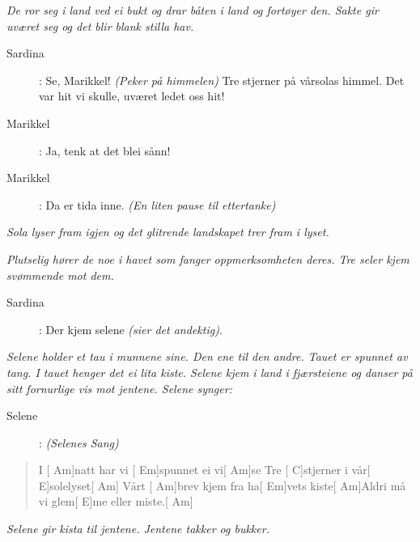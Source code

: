 {\noindent \textit{\color{gray} De ror seg i land ved ei bukt og drar båten i land og fortøyer den. Sakte gir uværet seg og det blir blank stilla hav.}

\begin{description}
\item[Sardina]: Se, Marikkel!  \textit{\color{gray} (Peker på himmelen)} Tre stjerner på vårsolas himmel. Det var hit vi skulle, uværet ledet oss hit!
\item[Marikkel]: Ja, tenk at det blei sånn!
\item[Marikkel]: Da er tida inne.  \textit{\color{gray} (En liten pause til ettertanke)} 
\end{description}

\noindent \textit{\color{gray} Sola lyser fram igjen og det glitrende landskapet trer fram i lyset.}

\noindent \textit{\color{gray} Plutselig hører de noe i havet som fanger oppmerksomheten deres. Tre seler kjem svømmende mot dem.}

\begin{description}
\item[Sardina]: Der kjem selene  \textit{\color{gray} (sier det andektig)}. 
\end{description}

\noindent \textit{\color{gray} Selene holder et tau i munnene sine. Den ene til den andre. Tauet er spunnet av tang. I tauet henger det ei lita kiste. Selene kjem i land i fjærsteiene og danser på sitt fornurlige vis mot jentene. Selene synger:}

\begin{description}
\item[Selene]: \textit{\color{gray} (Selenes Sang)} 
\end{description}

\begin{quote}
\begin{guitar}
\smallskip
I [\color{gray} Am]natt har vi [\color{gray} Em]spunnet ei vi[\color{gray} Am]se\smallskip
Tre [\color{gray} C]stjerner i vår[\color{gray} E]solelyset[\color{gray} Am]\smallskip
Vårt [\color{gray} Am]brev kjem fra ha[\color{gray} Em]vets kiste[\color{gray} Am]Aldri må vi glem[\color{gray} E]me eller miste.[\color{gray} Am]

\end{guitar}
\end{quote}

\noindent \textit{\color{gray} Selene gir kista til jentene. Jentene takker og bukker.} 

}
